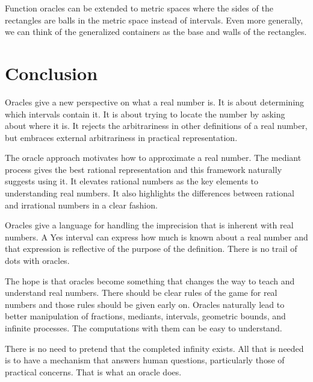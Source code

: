 \documentclass[12pt]{article}
\begin{document}
Function oracles can be extended to metric spaces where the sides of the rectangles are balls in the metric space instead of intervals. Even more generally, we can think of the generalized containers as the base and walls of the rectangles. 

\section{Conclusion}

Oracles give a new perspective on what a real number is. It is about determining which intervals contain it. It is about trying to locate the number by asking about where it is. It rejects the arbitrariness in other definitions of a real number, but embraces external arbitrariness in practical representation.

The oracle approach motivates how to approximate a real number. The mediant process gives the best rational representation and this framework naturally suggests using it. It elevates rational numbers as the key elements to understanding real numbers. It also highlights the differences between rational and irrational numbers in a clear fashion. 

Oracles give a language for handling the imprecision that is inherent with real numbers. A Yes interval can express how much is known about a real number and that expression is reflective of the purpose of the definition. There is no  trail of dots with oracles. 

The hope is that oracles become something that changes the way to teach and understand real numbers. There should be clear rules of the game for real numbers and those rules should be given early on. Oracles naturally lead to better manipulation of fractions, mediants, intervals, geometric bounds, and infinite processes. The computations with them can be easy to understand. 

There is no need to pretend that the completed infinity exists. All that is needed is to have a mechanism that answers human questions, particularly those of practical concerns. That is what an oracle does. 

\medskip

\normalem %
\printbibliography
\end{document}
